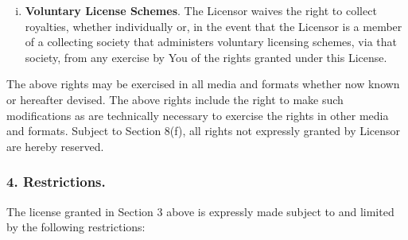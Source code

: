 \begin{enumerate}[a.]
\begin{enumerate}[i.]
              \item\textbf{Voluntary License Schemes}. The
              Licensor waives the right to collect royalties,
              whether individually or, in the event that the
              Licensor is a member of a collecting society that
              administers voluntary licensing schemes, via that
              society, from any exercise by You of the rights
              granted under this License.
\end{enumerate}
          
\end{enumerate}

        The above rights may be exercised in all media and
        formats whether now known or hereafter devised. The above
        rights include the right to make such modifications as are
        technically necessary to exercise the rights in other media
        and formats. Subject to Section 8(f), all rights not
        expressly granted by Licensor are hereby reserved.

        \subsubsection{4. Restrictions.} The license granted in
        Section 3 above is expressly made subject to and limited by
        the following restrictions:

